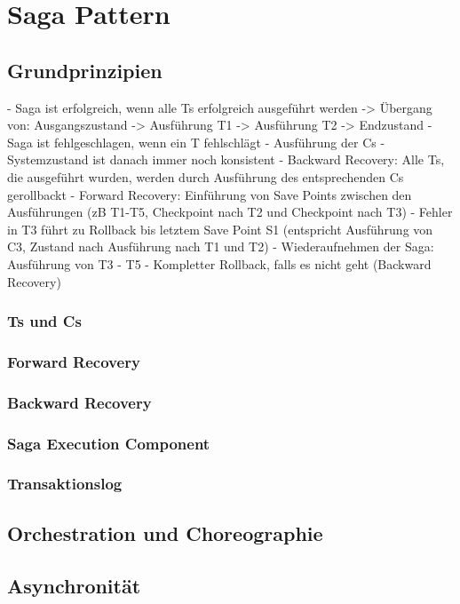 \chapter{Saga Pattern}

\section{Grundprinzipien}

- Saga ist erfolgreich, wenn alle Ts erfolgreich ausgeführt werden -> Übergang von: Ausgangszustand -> Ausführung T1 -> Ausführung T2 -> Endzustand
- Saga ist fehlgeschlagen, wenn ein T fehlschlägt
- Ausführung der Cs
- Systemzustand ist danach immer noch konsistent
- Backward Recovery: Alle Ts, die ausgeführt wurden, werden durch Ausführung des entsprechenden Cs gerollbackt
- Forward Recovery: Einführung von Save Points zwischen den Ausführungen (zB T1-T5, Checkpoint nach T2 und Checkpoint nach T3)
- Fehler in T3 führt zu Rollback bis letztem Save Point S1 (entspricht Ausführung von C3, Zustand nach Ausführung nach T1 und T2)
- Wiederaufnehmen der Saga: Ausführung von T3 - T5
- Kompletter Rollback, falls es nicht geht (Backward Recovery)

\subsection{Ts und Cs}

\subsection{Forward Recovery}

\subsection{Backward Recovery}

\subsection{Saga Execution Component}

\subsection{Transaktionslog}

\section{Orchestration und Choreographie}

\section{Asynchronität}